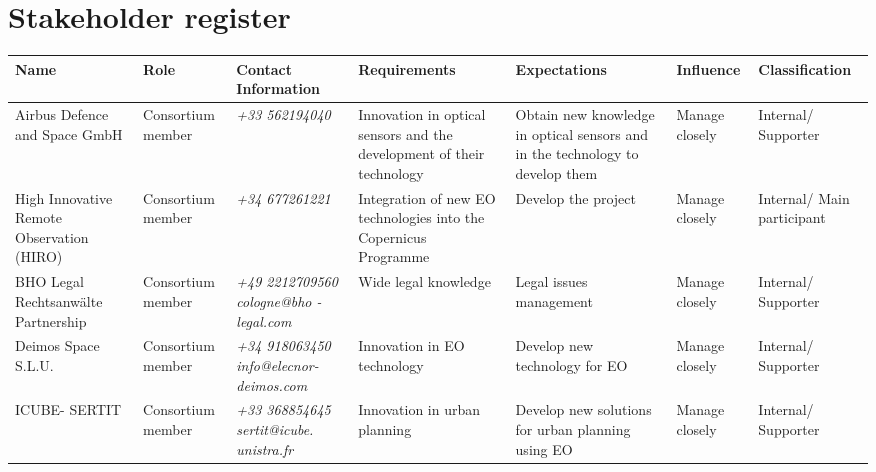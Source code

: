 \section{Stakeholder register}

\begin{small}

	\begin{longtable}{>{\raggedright\arraybackslash}p{1.8cm} >{\raggedright\arraybackslash}p{1.5cm} >{\raggedright\arraybackslash}p{2cm} >{\raggedright\arraybackslash}p{2cm} >{\raggedright\arraybackslash}p{2cm} >{\raggedright\arraybackslash}p{1.4cm} >{\raggedright\arraybackslash}p{1.7cm}}
		
		\toprule[2pt]
		
		\textbf{Name} & \textbf{Role} & \textbf{Contact Information} & \textbf{Requirements} & \textbf{Expectations} & \textbf{Influence} & \textbf{Classification} \\ 
		
		\midrule[1.5pt] \endhead
		
		Airbus Defence and Space GmbH & Consortium member & \textit{+33 562194040} & Innovation in optical sensors and the development of their technology & Obtain new knowledge in optical sensors and in the technology to develop them & Manage closely & Internal/ Supporter \\ \hline
		
		High Innovative Remote Observation (HIRO) & Consortium member & \textit{+34 677261221} & Integration of new EO technologies into the Copernicus Programme & Develop the project & Manage closely & Internal/ Main participant \\ \hline
		
		BHO Legal Rechtsanwälte Partnership & Consortium member & \textit{+49 2212709560 \newline \newline cologne@bho -legal.com} & Wide legal knowledge & Legal issues management & Manage closely & Internal/ Supporter \\ \hline
		
		Deimos Space S.L.U. & Consortium member & \textit{+34 918063450 \newline \newline info@elecnor- deimos.com} & Innovation in EO technology & Develop new technology for EO & Manage closely & Internal/ Supporter \\ \hline
		
		ICUBE- SERTIT & Consortium member & \textit{+33 368854645 \newline \newline sertit@icube. unistra.fr} & Innovation in urban planning & Develop new solutions for urban planning using EO & Manage closely & Internal/ Supporter \\ \hline
		

\end{longtable}
\end{small}
